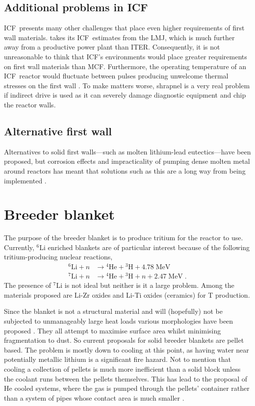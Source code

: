 \documentclass[12pt, a4paper]{article}
\newcommand{\mc}{MCF}
\newcommand{\ic}{ICF}
\newcommand{\ite}{ITER}
\begin{document}
		\subsection{Additional problems in \ic}
			\ic~presents many other challenges that place even higher requirements of first wall materials.  takes its \ic~estimates from the LMJ, which is much further away from a productive power plant than \ite. Consequently, it is not unreasonable to think that \ic's environments would place greater requirements on first wall materials than \mc. Furthermore, the operating temperature of an \ic~reactor would fluctuate between pulses producing unwelcome thermal stresses on the first wall \cite{ict1, ict2}. To make matters worse, shrapnel is a very real problem if indirect drive is used as it can severely damage diagnostic equipment and chip the reactor walls.
		\subsection{Alternative first wall}
			Alternatives to solid first walls---such as molten lithium-lead eutectics---have been proposed, but corrosion effects and impracticality of pumping dense molten metal around reactors has meant that solutions such as this are a long way from being implemented \cite{lfw1, lfw2, lfw3}.
	\section{Breeder blanket}\label{s:bb}
		The purpose of the breeder blanket is to produce tritium for the reactor to use. Currently, $^{6}$Li enriched blankets are of particular interest because of the following tritium-producing nuclear reactions,
		\begin{align}
			\textrm{$^{6}$Li} + n &\to \textrm{$^{4}$He} + \textrm{$^{3}$H} + 4.78\; \textrm{MeV} \\
			\textrm{$^{7}$Li} + n &\to \textrm{$^{4}$He} + \textrm{$^{3}$H} + n + 2.47\; \textrm{MeV}\; .
		\end{align}
		The presence of $^{7}$Li is not ideal but neither is it a large problem. Among the materials proposed are Li-Zr oxides and Li-Ti oxides (ceramics) for T production.
		
		Since the blanket is not a structural material and will (hopefully) not be subjected to unmanageably large heat loads various morphologies have been proposed \cite{bb1, bb2, bb3}. They all attempt to maximise surface area whilst minimising fragmentation to dust. So current proposals for solid breeder blankets are pellet based. The problem is mostly down to cooling at this point, as having water near potentially metallic lithium is a significant fire hazard. Not to mention that cooling a collection of pellets is much more inefficient than a solid block unless the coolant runs between the pellets themselves. This has lead to the proposal of He cooled systems, where the gas is pumped through the pellets' container rather than a system of pipes whose contact area is much smaller \cite{bb4}.
		
\end{document}
